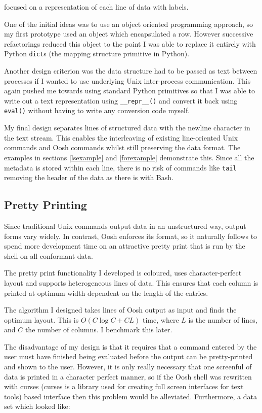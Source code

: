 \documentclass[12pt,twoside,notitlepage]{report}
\begin{document}
 focused on a representation of each line of data
with labels. %

One of the initial ideas was to use an object oriented programming
approach, so my first prototype used an object which encapsulated
a row. However successive refactorings reduced this object to the point
I was able to replace it entirely with Python {\tt dict}s (the mapping
structure primitive in Python).

Another design criterion was the data structure had to be passed as
text between processes if I wanted to use underlying Unix
inter-process communication. This again pushed me towards using
standard Python primitives so that I was able to write out a text
representation using {\tt \_\_repr\_\_()} and convert it back using
{\tt eval()} without having to write any conversion code myself.

My final design separates lines of structured data with the newline
character in the text stream. This enables the interleaving of
existing line-oriented Unix commands and Oosh commands whilst still
preserving the data format. The examples in sections \ref{lsexample}
and \ref{forexample} demonstrate this. Since all the metadata is
stored within each line, there is no risk of commands like {\tt tail}
removing the header of the data as there is with Bash.

\subsection{Pretty Printing}
\label{prettyimpl}
Since traditional Unix commands output data in an unstructured way, output forms
vary widely. In contrast, Oosh enforces its format, so it naturally follows to
spend more development time on an attractive pretty print that is run by the
shell on all conformant data.

The pretty print functionality I developed is coloured, uses character-perfect
layout and supports heterogeneous lines of data. This ensures that each column
is printed at optimum width dependent on the length of the entries.

The algorithm I designed takes lines of Oosh output as input and finds
the optimum layout. This is $O(C \log C + CL)$ time, where $L$ is the
number of lines, and $C$ the number of columns. I benchmark this
later. %

The disadvantage of my design is that it requires that a command
entered by the user must have finished being evaluated before the
output can be pretty-printed and shown to the user. However, it is
only really necessary that one screenful of data is printed in a
character perfect manner, so if the Oosh shell was rewritten with
curses (curses is a library used for creating full screen interfaces
for text tools) based interface then this problem would be
alleviated. Furthermore, a data set which looked like:
\end{document}
